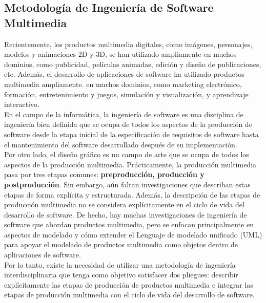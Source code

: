 \subsection{Metodología de Ingeniería de Software Multimedia}
Recientemente, los productos multimedia digitales, como imágenes, personajes, modelos y animaciones 2D y 3D, se han utilizado ampliamente en muchos dominios, como publicidad, 
películas animadas, edición y diseño de publicaciones, etc. Además, el desarrollo de aplicaciones de software ha utilizado productos multimedia ampliamente. en muchos dominios, 
como marketing electrónico, formación, entretenimiento y juegos, simulación y visualización, y aprendizaje interactivo.\\
En el campo de la informática, la ingeniería de software es una disciplina de ingeniería bien definida que se ocupa de todos los aspectos de la producción de software desde la 
etapa inicial de la especificación de requisitos de software hasta el mantenimiento del software desarrollado después de su implementación.\\
 Por otro lado, el diseño gráfico es un campo de arte que se ocupa de todos los aspectos de la producción multimedia. Prácticamente, la producción multimedia pasa por tres 
 etapas comunes: \textbf{preproducción, producción y postproducción}. Sin embargo, a\'un faltan investigaciones que describan estas etapas de forma explícita y estructurada. Además, la 
 descripción de las etapas de producción multimedia no se considera explícitamente en el ciclo de vida del desarrollo de software. De hecho, hay muchas investigaciones de 
 ingeniería de software que abordan productos multimedia, pero se enfocan principalmente en aspectos de modelado y cómo extender el Lenguaje de modelado unificado (UML) 
 para apoyar el modelado de productos multimedia como objetos dentro de aplicaciones de software.\\
Por lo tanto, existe la necesidad de utilizar una metodología de ingeniería interdisciplinaria que tenga como objetivo satisfacer dos pliegues: describir explícitamente las etapas 
de producción de productos multimedia e integrar las etapas de producción multimedia con el ciclo de vida del desarrollo de software.\cite{al2019multimedia}


